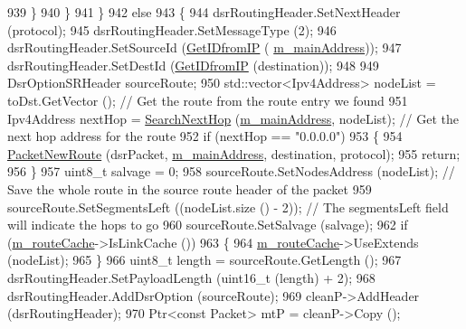 \begin{DoxyCode}
939                    \}
940                 \}
941             \}
942           \textcolor{keywordflow}{else}
943             \{
944               dsrRoutingHeader.SetNextHeader (protocol);
945               dsrRoutingHeader.SetMessageType (2);
946               dsrRoutingHeader.SetSourceId (\hyperlink{classns3_1_1dsr_1_1DsrRouting_a4593e50d5f36e9b9b013fe0422067c44}{GetIDfromIP} (
      \hyperlink{classns3_1_1dsr_1_1DsrRouting_a73182b5edee2d8460f28855e058fc9a0}{m\_mainAddress}));
947               dsrRoutingHeader.SetDestId (\hyperlink{classns3_1_1dsr_1_1DsrRouting_a4593e50d5f36e9b9b013fe0422067c44}{GetIDfromIP} (destination));
948 
949               DsrOptionSRHeader sourceRoute;
950               std::vector<Ipv4Address> nodeList = toDst.GetVector (); \textcolor{comment}{// Get the route from the route entry
       we found}
951               Ipv4Address nextHop = \hyperlink{classns3_1_1dsr_1_1DsrRouting_aa1b16658c14499af76ca7dd69c034f22}{SearchNextHop} (\hyperlink{classns3_1_1dsr_1_1DsrRouting_a73182b5edee2d8460f28855e058fc9a0}{m\_mainAddress}, nodeList);  \textcolor{comment}{//
       Get the next hop address for the route}
952               \textcolor{keywordflow}{if} (nextHop == \textcolor{stringliteral}{"0.0.0.0"})
953                 \{
954                   \hyperlink{classns3_1_1dsr_1_1DsrRouting_ae70ab39db551d1d81afc081196f78017}{PacketNewRoute} (dsrPacket, \hyperlink{classns3_1_1dsr_1_1DsrRouting_a73182b5edee2d8460f28855e058fc9a0}{m\_mainAddress}, destination, 
      protocol);
955                   \textcolor{keywordflow}{return};
956                 \}
957               uint8\_t salvage = 0;
958               sourceRoute.SetNodesAddress (nodeList); \textcolor{comment}{// Save the whole route in the source route header of
       the packet}
959               sourceRoute.SetSegmentsLeft ((nodeList.size () - 2)); \textcolor{comment}{// The segmentsLeft field will indicate
       the hops to go}
960               sourceRoute.SetSalvage (salvage);
962               \textcolor{keywordflow}{if} (\hyperlink{classns3_1_1dsr_1_1DsrRouting_ac409bdb961b9fff0fb63ebd026be99ad}{m\_routeCache}->IsLinkCache ())
963                 \{
964                   \hyperlink{classns3_1_1dsr_1_1DsrRouting_ac409bdb961b9fff0fb63ebd026be99ad}{m\_routeCache}->UseExtends (nodeList);
965                 \}
966               uint8\_t length = sourceRoute.GetLength ();
967               dsrRoutingHeader.SetPayloadLength (uint16\_t (length) + 2);
968               dsrRoutingHeader.AddDsrOption (sourceRoute);
969               cleanP->AddHeader (dsrRoutingHeader);
970               Ptr<const Packet> mtP = cleanP->Copy ();

\end{DoxyCode}
